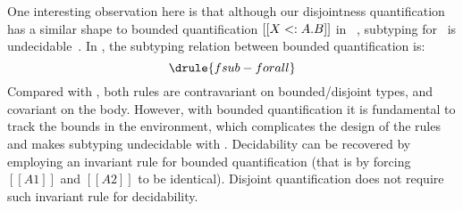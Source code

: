 One interesting observation here is that although our disjointness
quantification has a similar shape to bounded quantification $[[\/X<:A. B]]$ in
\fsub~\citep{cardelli1985understanding}, subtyping for \fsub~is
undecidable~\citep{pierce1994bounded}. In \fsub, the subtyping relation between
bounded quantification is:
{\small
\[
  \drule{fsub-forall}
\]
}%
Compared with , both rules are contravariant on
bounded/disjoint types, and covariant on the body. However, with bounded
quantification it is fundamental to track the bounds in the
environment, which complicates the design of the rules and makes
subtyping undecidable with .
Decidability can be recovered
by employing an invariant rule for bounded quantification
(that is by forcing $[[A1]]$ and $[[A2]]$ to be identical).
Disjoint quantification does not require such invariant rule for
decidability.

\begin{comment}
For example, in the original
type $[[\/X<:A1. B1]]$, the $[[X]]$ in $[[B1]]$ is thought of being bound to
$[[A1]]$, the premise $[[DD, X <: A2 |- B1 <: B2]]$ forces $[[X]]$ to be bound
to $[[A2]]$ in $[[B1]]$. This destroys the original connection and makes it
impossible to give a decision procedure.
\end{comment}

